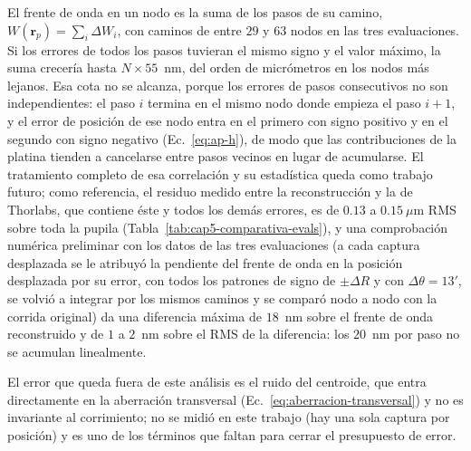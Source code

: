 \documentclass[letterpaper,12pt,oneside]{book}
\begin{document}
El frente de onda en un nodo es la suma de los pasos de su camino, $W(\mathbf{r}_p) =
\sum_i \Delta W_i$, con caminos de entre $29$ y $63$ nodos en las tres evaluaciones. Si
los errores de todos los pasos tuvieran el mismo signo y el valor máximo, la suma crecería
hasta $N \times 55$~nm, del orden de micrómetros en los nodos más lejanos. Esa cota no se
alcanza, porque los errores de pasos consecutivos no son independientes: el paso $i$
termina en el mismo nodo donde empieza el paso $i+1$, y el error de posición de ese nodo
entra en el primero con signo positivo y en el segundo con signo negativo
(Ec.~\ref{eq:ap-h}), de modo que las contribuciones de la platina tienden a cancelarse
entre pasos vecinos en lugar de acumularse. El tratamiento completo de esa correlación y
su estadística queda como trabajo futuro; como referencia, el residuo medido entre la
reconstrucción y la de Thorlabs, que contiene éste y todos los demás errores, es de
$0.13$ a $0.15~\mu$m RMS sobre toda la pupila (Tabla~\ref{tab:cap5-comparativa-evals}),
y una comprobación numérica preliminar con los datos de las tres evaluaciones (a cada
captura desplazada se le atribuyó la pendiente del frente de onda en la posición
desplazada por su error,
con todos los patrones de signo de $\pm\Delta R$ y con $\Delta\theta = 13'$, se volvió a
integrar por los mismos caminos y se comparó nodo a nodo con la corrida original) da una
diferencia máxima de $18$~nm sobre el frente de onda reconstruido y de $1$ a $2$~nm sobre
el RMS de la diferencia: los $20$~nm por paso no se acumulan linealmente.

El error que queda fuera de este análisis es el ruido del centroide, que entra
directamente en la aberración transversal (Ec.~\ref{eq:aberracion-transversal}) y no es
invariante al corrimiento; no se midió en este trabajo (hay una sola captura por
posición) y es uno de los términos que faltan para cerrar el presupuesto de error.
\end{document}
